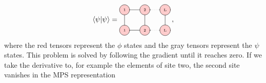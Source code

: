 \documentclass[twoside,twocolumn,9pt]{article}
\begin{document}
\begin{equation}
  \bra{\psi}\ket{\psi} = \\
  \begin{tikzpicture}[baseline={([yshift=-.5ex]current bounding box.center)}]
    \draw[gray, thick] (0,0) -- (0,-1);
    \draw[gray, thick] (1,0) -- (1,-1);
    \draw[gray, thick] (2,0) -- (2,-1);

    \draw[gray, thick] (0,0) -- (1.3,0);
    \draw[gray, dotted] (1.3,0) -- (1.7,0);
    \draw[gray, thick] (1.7,0) -- (2.0,0);

    \draw[gray, thick] (0,-1) -- (1.3,-1);
    \draw[gray, dotted] (1.3,-1) -- (1.7,-1);
    \draw[gray, thick] (1.7,-1) -- (2.0,-1);

    \node[draw, circle, line cap=round, fill=red!20] at (0,0) {\tiny 1};
    \node[draw, circle, line cap=round, fill=red!20] at (1,0) {\tiny 2};
    \node[draw, circle, line cap=round, fill=red!20] at (2,0) {\tiny L};

    \node[draw, circle, line cap=round, fill=red!20] at (0,-1) {\tiny 1};
    \node[draw, circle, line cap=round, fill=red!20] at (1,-1) {\tiny 2};
    \node[draw, circle, line cap=round, fill=red!20] at (2,-1) {\tiny L};    
  \end{tikzpicture} \thinspace ,
\end{equation}
where the red tensors represent the $\phi$ states and the gray tensors represent the $\psi$ states. This problem is solved by following the gradient until it reaches zero. If we take the derivative to, for example the elements of site two, the second site vanishes in the MPS representation
\end{document}
